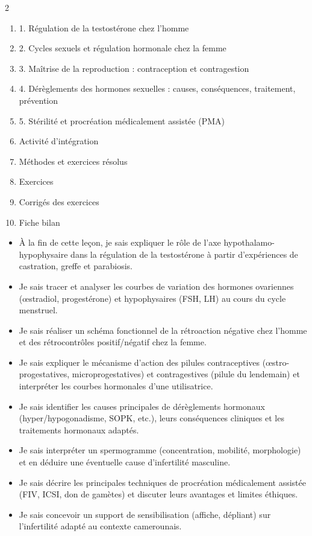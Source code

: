 \documentclass[11pt]{article}
\begin{document}
\begin{sommaire}
\begin{multicols}{2}
\begin{enumerate}
\item 1. Régulation de la testostérone chez l'homme
\item 2. Cycles sexuels et régulation hormonale chez la femme
\item 3. Maîtrise de la reproduction : contraception et contragestion
\item 4. Dérèglements des hormones sexuelles : causes, conséquences, traitement, prévention
\item 5. Stérilité et procréation médicalement assistée (PMA)
\item Activité d'intégration
\item Méthodes et exercices résolus
\item Exercices
\item Corrigés des exercices
\item Fiche bilan
\end{enumerate}
\end{multicols}
\end{sommaire}

\begin{objectifs}
\begin{itemize}
\item À la fin de cette leçon, je sais expliquer le rôle de l'axe hypothalamo-hypophysaire dans la régulation de la testostérone à partir d'expériences de castration, greffe et parabiosis.
\item Je sais tracer et analyser les courbes de variation des hormones ovariennes (œstradiol, progestérone) et hypophysaires (FSH, LH) au cours du cycle menstruel.
\item Je sais réaliser un schéma fonctionnel de la rétroaction négative chez l'homme et des rétrocontrôles positif/négatif chez la femme.
\item Je sais expliquer le mécanisme d'action des pilules contraceptives (œstro-progestatives, microprogestatives) et contragestives (pilule du lendemain) et interpréter les courbes hormonales d'une utilisatrice.
\item Je sais identifier les causes principales de dérèglements hormonaux (hyper/hypogonadisme, SOPK, etc.), leurs conséquences cliniques et les traitements hormonaux adaptés.
\item Je sais interpréter un spermogramme (concentration, mobilité, morphologie) et en déduire une éventuelle cause d'infertilité masculine.
\item Je sais décrire les principales techniques de procréation médicalement assistée (FIV, ICSI, don de gamètes) et discuter leurs avantages et limites éthiques.
\item Je sais concevoir un support de sensibilisation (affiche, dépliant) sur l'infertilité adapté au contexte camerounais.
\end{itemize}
\end{objectifs}
\end{document}
